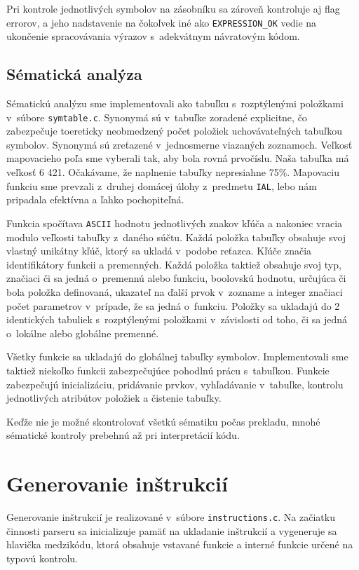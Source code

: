 \documentclass [11pt, a4paper]{article}
\begin{document}
Pri kontrole jednotlivých symbolov na zásobníku sa zároveň kontroluje aj flag errorov, a jeho nadstavenie na čokoľvek iné ako \texttt{EXPRESSION\_OK} vedie na ukončenie spracovávania výrazov s~adekvátnym návratovým kódom.

\subsection{Sématická analýza}
Sématickú analýzu sme implementovali ako tabuľku s~rozptýlenými položkami v~súbore \texttt{symtable.c}. Synonymá sú v~tabuľke zoradené explicitne, čo zabezpečuje toereticky neobmedzený počet položiek uchovávateľných tabuľkou symbolov. Synonymá sú zreťazené v~jednosmerne viazaných zoznamoch. Veľkosť mapovacieho poľa sme vyberali tak, aby bola rovná prvočíslu. Naša tabuľka má veľkosť 6 421. Očakávame, že naplnenie tabuľky nepresiahne 75\%. Mapovaciu funkciu sme prevzali z~druhej domácej úlohy z~predmetu \texttt{IAL}, lebo nám pripadala efektívna a ľahko pochopiteľná. 

Funkcia spočítava \texttt{ASCII} hodnotu jednotlivých znakov kľúča a nakoniec vracia modulo veľkosti tabuľky z~daného súčtu. Každá položka tabuľky obsahuje svoj vlastný unikátny kľúč, ktorý sa ukladá v~podobe reťazca. Kľúče značia identifikátory funkcii a premenných. Každá položka taktiež obsahuje svoj typ, značiaci či sa jedná o~premennú alebo funkciu, boolovskú hodnotu, určujúca či bola položka definovaná, ukazateľ na ďalší prvok v~zozname a integer značiaci počet parametrov v~prípade, že sa jedná o~funkciu. Položky sa ukladajú do 2 identických tabuliek s~rozptýlenými položkami v~závislosti od toho, či sa jedná o~lokálne alebo globálne premenné.

Všetky funkcie sa ukladajú do globálnej tabuľky symbolov. Implementovali sme taktiež niekoľko funkcii zabezpečujúce pohodlnú prácu s~tabuľkou. Funkcie zabezpečujú inicializáciu, pridávanie prvkov, vyhľadávanie v~tabuľke, kontrolu jednotlivých atribútov položiek a čistenie tabuľky.

Keďže nie je možné skontrolovať všetkú sématiku počas prekladu, mnohé sématické kontroly prebehnú až pri interpretácií kódu.

\section{Generovanie inštrukcií}
Generovanie inštrukcií je realizované v~súbore \texttt{instructions.c}. Na začiatku činnosti parseru sa inicializuje pamäť na ukladanie inštrukcií a vygeneruje sa hlavička medzikódu, ktorá obsahuje vstavané funkcie a interné funkcie určené na typovú kontrolu. 
\end{document}
